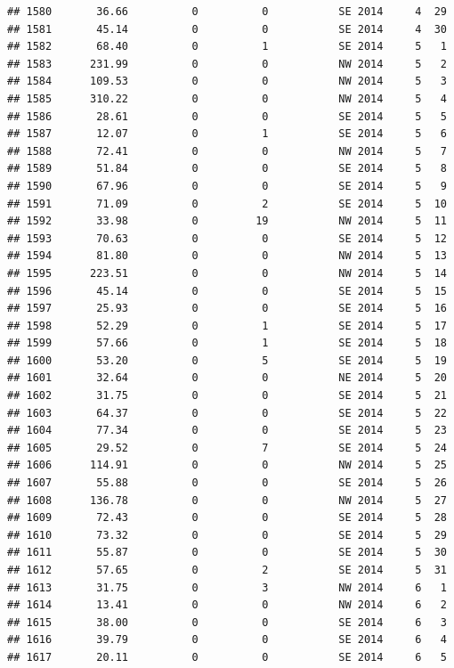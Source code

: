 \documentclass[
]{article}
\begin{document}
\begin{verbatim}
## 1580       36.66          0          0           SE 2014     4  29
## 1581       45.14          0          0           SE 2014     4  30
## 1582       68.40          0          1           SE 2014     5   1
## 1583      231.99          0          0           NW 2014     5   2
## 1584      109.53          0          0           NW 2014     5   3
## 1585      310.22          0          0           NW 2014     5   4
## 1586       28.61          0          0           SE 2014     5   5
## 1587       12.07          0          1           SE 2014     5   6
## 1588       72.41          0          0           NW 2014     5   7
## 1589       51.84          0          0           SE 2014     5   8
## 1590       67.96          0          0           SE 2014     5   9
## 1591       71.09          0          2           SE 2014     5  10
## 1592       33.98          0         19           NW 2014     5  11
## 1593       70.63          0          0           SE 2014     5  12
## 1594       81.80          0          0           NW 2014     5  13
## 1595      223.51          0          0           NW 2014     5  14
## 1596       45.14          0          0           SE 2014     5  15
## 1597       25.93          0          0           SE 2014     5  16
## 1598       52.29          0          1           SE 2014     5  17
## 1599       57.66          0          1           SE 2014     5  18
## 1600       53.20          0          5           SE 2014     5  19
## 1601       32.64          0          0           NE 2014     5  20
## 1602       31.75          0          0           SE 2014     5  21
## 1603       64.37          0          0           SE 2014     5  22
## 1604       77.34          0          0           SE 2014     5  23
## 1605       29.52          0          7           SE 2014     5  24
## 1606      114.91          0          0           NW 2014     5  25
## 1607       55.88          0          0           SE 2014     5  26
## 1608      136.78          0          0           NW 2014     5  27
## 1609       72.43          0          0           SE 2014     5  28
## 1610       73.32          0          0           SE 2014     5  29
## 1611       55.87          0          0           SE 2014     5  30
## 1612       57.65          0          2           SE 2014     5  31
## 1613       31.75          0          3           NW 2014     6   1
## 1614       13.41          0          0           NW 2014     6   2
## 1615       38.00          0          0           SE 2014     6   3
## 1616       39.79          0          0           SE 2014     6   4
## 1617       20.11          0          0           SE 2014     6   5

\end{verbatim}
\end{document}
